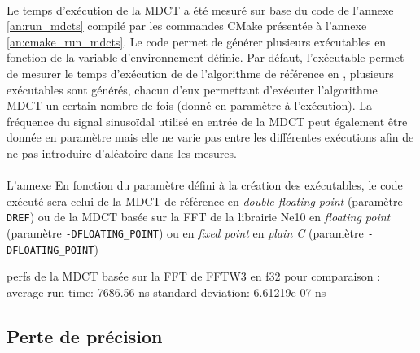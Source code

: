 \documentclass{article}
\begin{document}
    \paragraph{}
    Le temps d'exécution de la MDCT a été mesuré sur base du code de l'annexe \ref{an:run_mdcts} compilé par les commandes CMake présentée à l'annexe \ref{an:cmake_run_mdcts}. Le code permet de générer plusieurs exécutables en fonction de la variable d'environnement définie. Par défaut, l'exécutable permet de mesurer le temps d'exécution de de l'algorithme de référence en , plusieurs exécutables sont générés, chacun d'eux permettant d'exécuter l'algorithme MDCT un certain nombre de fois (donné en paramètre à l'exécution). La fréquence du signal sinusoïdal utilisé en entrée de la MDCT peut également être donnée en paramètre mais elle ne varie pas entre les différentes exécutions afin de ne pas introduire d'aléatoire dans les mesures.

    \paragraph{}
    L'annexe  En fonction du paramètre défini à la création des exécutables, le code exécuté sera celui de la MDCT de référence en \emph{double floating point} (paramètre \texttt{-DREF}) ou de la MDCT basée sur la FFT de la librairie Ne10 en \emph{floating point} (paramètre \texttt{-DFLOATING\_POINT}) ou en \emph{fixed point} en \emph{plain C} (paramètre \texttt{-DFLOATING\_POINT}) 


    perfs de la MDCT basée sur la FFT de FFTW3 en f32 pour comparaison :
    average run time:   7686.56 ns
    standard deviation: 6.61219e-07 ns
 





    \subsection{Perte de précision}
\end{document}
